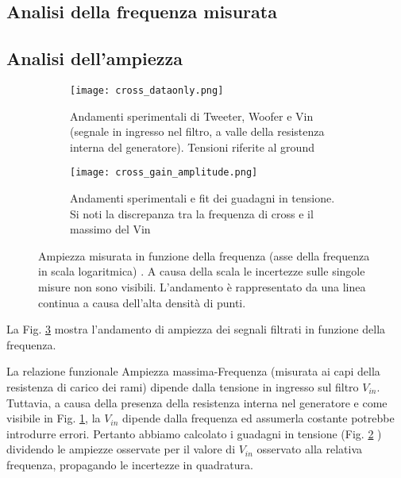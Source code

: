\documentclass[../Relazione_circuiti]{subfiles}
\begin{document}
\subsection{Analisi della frequenza misurata}

\subsection{Analisi dell'ampiezza}

  \begin{figure}[H]
    \centering

    \begin{subfigure}{=0.5\textwidth}

      \texttt{[image: cross\_dataonly.png]}

      \caption{Andamenti sperimentali di Tweeter, Woofer e Vin (segnale in ingresso nel filtro,
        a valle della resistenza interna del generatore). Tensioni riferite al ground}
      \label{fig: amplitude_dataonly}

    \end{subfigure}

    \begin{subfigure}{=0.5\textwidth}

      \texttt{[image: cross\_gain\_amplitude.png]}

      \caption
      {Andamenti sperimentali e fit dei guadagni in tensione. Si noti la discrepanza tra la frequenza di cross e il
      massimo del Vin}
      \label{fig:cross_gain}
    \end{subfigure}

    \caption{Ampiezza misurata in funzione della frequenza (asse della frequenza in scala logaritmica)
      . A causa della scala le incertezze sulle singole misure non sono visibili. L'andamento è rappresentato da una
      linea continua a causa dell'alta densità di punti.}
    \label{fig:cross_amplitude}

  \end{figure}

  La Fig. \ref{fig:cross_amplitude} mostra l'andamento di ampiezza dei segnali filtrati in funzione della frequenza.

  La relazione funzionale Ampiezza massima-Frequenza (misurata ai capi della resistenza di carico dei rami) dipende
  dalla tensione in ingresso sul filtro $V_{in}$.
  Tuttavia, a causa della presenza della resistenza interna nel generatore e come visibile in Fig.
  \ref{fig: amplitude_dataonly}, la $V_{in}$
  dipende dalla frequenza ed assumerla costante potrebbe introdurre errori.
  Pertanto abbiamo calcolato i guadagni in tensione (Fig. \ref{fig:cross_gain}
  ) dividendo le ampiezze osservate per il valore di $V_{in}$
  osservato alla relativa frequenza, propagando le incertezze in quadratura.
\end{document}
